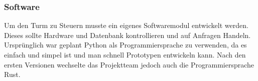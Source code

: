 \subsubsection{Software}

Um den Turm zu Steuern musste ein eigenes Softwaremodul entwickelt werden. Dieses sollte Hardware und Datenbank kontrollieren und auf Anfragen Handeln. Ursprünglich war geplant Python als Programmiersprache zu verwenden, da es einfach und simpel ist und man schnell Prototypen entwickeln kann. Nach den ersten Versionen wechselte das Projektteam jedoch auch die Programmiersprache Rust.








